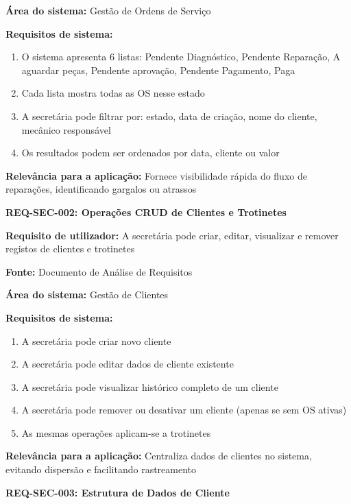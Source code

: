 \documentclass[11pt,a4paper]{article}
\newcommand{\reqheader}[1]{{\noindent\large\bfseries\color{sectionblue}#1}\par\vspace{0.3cm}}
\newcommand{\reqfield}[2]{{\noindent\textbf{#1:} #2}\par\vspace{0.2cm}}
\begin{document}
\reqfield{Área do sistema}{Gestão de Ordens de Serviço}

\reqfield{Requisitos de sistema}{
	\begin{enumerate}
		\item O sistema apresenta 6 listas: Pendente Diagnóstico, Pendente Reparação, A aguardar peças, Pendente aprovação, Pendente Pagamento, Paga
		\item Cada lista mostra todas as OS nesse estado
		\item A secretária pode filtrar por: estado, data de criação, nome do cliente, mecânico responsável
		\item Os resultados podem ser ordenados por data, cliente ou valor
	\end{enumerate}
}

\reqfield{Relevância para a aplicação}{Fornece visibilidade rápida do fluxo de reparações, identificando gargalos ou atrassos}

\vspace{0.8cm}

\reqheader{REQ-SEC-002: Operações CRUD de Clientes e Trotinetes}

\reqfield{Requisito de utilizador}{A secretária pode criar, editar, visualizar e remover registos de clientes e trotinetes}

\reqfield{Fonte}{Documento de Análise de Requisitos}

\reqfield{Área do sistema}{Gestão de Clientes}

\reqfield{Requisitos de sistema}{
	\begin{enumerate}
		\item A secretária pode criar novo cliente
		\item A secretária pode editar dados de cliente existente
		\item A secretária pode visualizar histórico completo de um cliente
		\item A secretária pode remover ou desativar um cliente (apenas se sem OS ativas)
		\item As mesmas operações aplicam-se a trotinetes
	\end{enumerate}
}

\reqfield{Relevância para a aplicação}{Centraliza dados de clientes no sistema, evitando dispersão e facilitando rastreamento}

\vspace{0.8cm}

\reqheader{REQ-SEC-003: Estrutura de Dados de Cliente}
\end{document}
